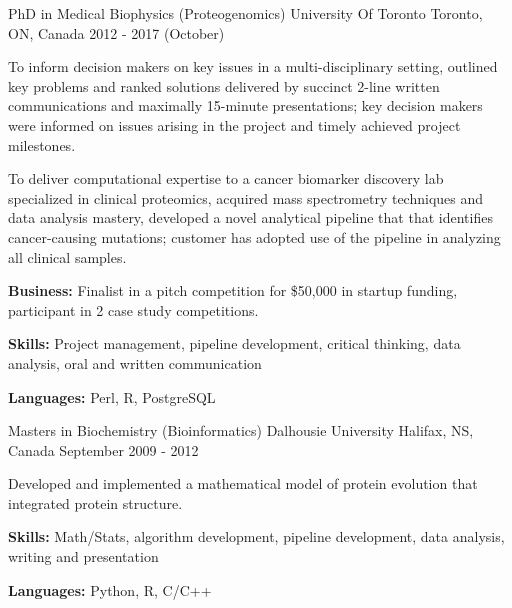 


\begin{cventries}

\cventry
{PhD in Medical Biophysics (Proteogenomics)} %
{University Of Toronto} %
{Toronto, ON,  Canada} %
	{2012 - 2017 (October)} %
{ %
 \begin{cvitems}
 \item {To inform decision makers on key issues in a multi-disciplinary setting, outlined key problems and ranked solutions delivered by succinct 2-line written communications and maximally 15-minute presentations; key decision makers were informed on issues arising in the project and timely achieved project milestones.}
 \item {To deliver computational expertise to a cancer biomarker discovery lab specialized in clinical proteomics, acquired mass spectrometry techniques and data analysis mastery, developed a novel analytical pipeline that that identifies cancer-causing mutations; customer has adopted use of the pipeline in analyzing all clinical samples.}
 \item {\textbf{Business:} Finalist in a pitch competition for \$50,000 in startup funding, participant in 2 case study competitions.}
 \item {\textbf{Skills:} Project management, pipeline development, critical thinking, data analysis, oral and written communication}
 \item {\textbf{Languages:} Perl, R, PostgreSQL}
 \end{cvitems}
}

\cventry
{Masters in Biochemistry (Bioinformatics)} %
{Dalhousie University} %
{Halifax, NS, Canada} %
{September 2009 - 2012} %
{
 \begin{cvitems}
 \item {Developed and implemented a mathematical model of protein evolution that integrated protein structure.}
 \item {\textbf{Skills:} Math/Stats, algorithm development, pipeline development, data analysis, writing and presentation}
 \item {\textbf{Languages:} Python, R, C/C++}
 \end{cvitems}
}


\end{cventries}

